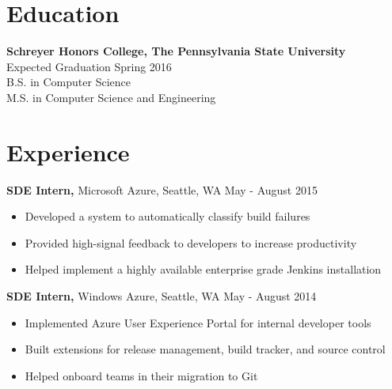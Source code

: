 \documentclass[margin]{res}
\begin{document}
 
\address{{\bf Present  Address} \\ 159 Hemlock Hill Rd \\ State College, PA 16803 \\ douglasjordan0@gmail.com \\
        (814) 574-8768 }

\address{{\bf Permanent Address} \\ 159 Hemlock Hill Rd \\ State College, PA 16803 \\ douglasjordan0@gmail.com \\
        (814) 574-8768 }
\begin{resume} 

\section{Education} 
{\bf Schreyer Honors College, The Pennsylvania State University} \\
Expected Graduation Spring 2016 \\
B.S. in Computer Science \\
M.S. in Computer Science and Engineering \\

\section{Experience}

{\bf SDE Intern,} Microsoft Azure, Seattle, WA \hfill May - August 2015
\begin{itemize} \itemsep -2pt  %
\item Developed a system to automatically classify build failures
\item Provided high-signal feedback to developers to increase productivity
\item Helped implement a highly available enterprise grade Jenkins installation
\end{itemize}

{\bf SDE Intern,} Windows Azure, Seattle, WA \hfill May - August 2014
\begin{itemize} \itemsep -2pt  %
\item Implemented Azure User Experience Portal for internal developer tools
\item Built extensions for release management, build tracker, and source control
\item Helped onboard teams in their migration to Git
\end{itemize}


\end{resume}
\end{document}
